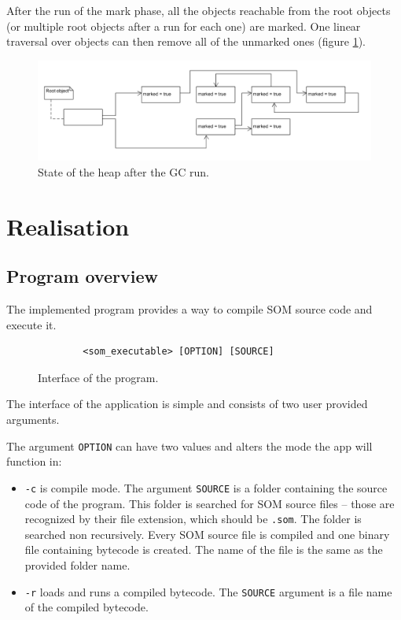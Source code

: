 \documentclass[thesis=M,english]{FITthesis}[2019/12/23]
\begin{document}
After the run of the mark phase, all the objects reachable from the root objects (or multiple root objects after a run for each one) are marked.
One linear traversal over objects can then remove all of the unmarked ones (figure \ref{fig:gc_step3}).

\begin{figure}[h!]
	\centering
	\includegraphics[width=\linewidth]{media/gc_ms_step3.png}
	\caption{State of the heap after the GC run.}
	\label{fig:gc_step3}
\end{figure}

\chapter{Realisation}

\section{Program overview}
The implemented program provides a way to compile SOM source code and execute it.

\begin{figure}[h!]
	\centering
	\begin{verbatim}
		<som_executable> [OPTION] [SOURCE]
	\end{verbatim}
	\caption{Interface of the program.}
	\label{fig:prog_interface}
\end{figure}

The interface of the application is simple and consists of two user provided arguments.

The argument \texttt{OPTION} can have two values and alters the mode the app will function in:
\begin{itemize}
	\item \texttt{-c} is compile mode. The argument \texttt{SOURCE} is a folder containing the source code of the program.
		This folder is searched for SOM source files -- those are recognized by their file extension, which should be \texttt{.som}.
		The folder is searched non recursively. Every SOM source file is compiled and one binary file containing bytecode is created.
		The name of the file is the same as the provided folder name.
	\item \texttt{-r} loads and runs a compiled bytecode. The \texttt{SOURCE} argument is a file name of the compiled bytecode.
\end{itemize}
\end{document}
